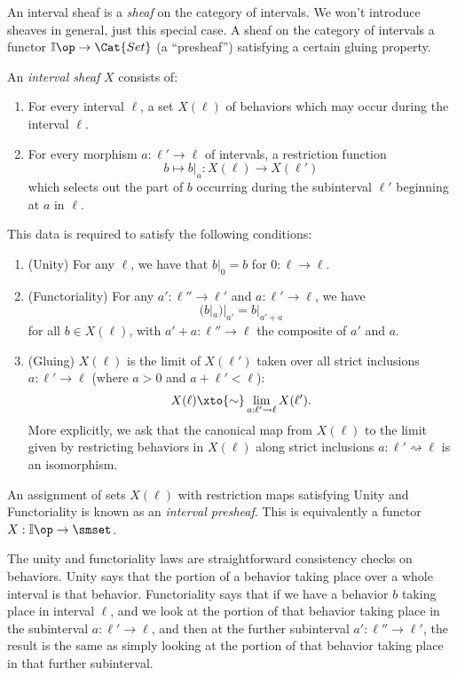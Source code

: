 \documentclass[DynamicalBook]{subfiles}
\begin{document}
 An interval sheaf is a \emph{sheaf} on the category of intervals. We won't introduce sheaves in general, just this special case. A sheaf on the category of intervals a functor $\mathbb{I}\op \to \Cat{Set}$ (a
 ``presheaf'') satisfying a certain gluing property.
 \begin{definition}
   An \emph{interval sheaf} $X$ consists of:
   \begin{enumerate}
           \item For every interval $\ell$, a set $X(\ell)$ of behaviors which may occur during the interval $\ell$.
     \item For every morphism $a : \ell' \to \ell$ of intervals, a restriction function
           $$b \mapsto b|_{a} : X(\ell) \to X(\ell')$$
           which selects out the part of $b$ occurring during the subinterval $\ell'$ beginning at $a$ in $\ell$.
    \end{enumerate}
    This data is required to satisfy the following conditions:
    \begin{enumerate}
            \item (Unity) For any $\ell$, we have that $b|_{0} = b$ for $0 : \ell \to \ell$.
      \item (Functoriality) For any $a' : \ell'' \to \ell'$ and $a : \ell' \to \ell$, we have
            $$(b|_{a})|_{a'} = b|_{a' + a}$$
            for all $b \in X(\ell)$, with $a' + a : \ell'' \to \ell$ the composite of $a'$ and $a$.
      \item (Gluing) $X(\ell)$ is the limit of $X(\ell')$ taken over all strict inclusions $a : \ell' \to \ell$ (where $a > 0$ and $a + \ell' < \ell$):
            \[
            X(\ell) \xto{\sim} \lim_{a : \ell' \rightsquigarrow \ell} X(\ell').
            \]
More explicitly, we ask that the canonical map from $X(\ell)$ to the limit given by restricting behaviors in $X(\ell)$ along strict inclusions $a : \ell' \rightsquigarrow \ell$ is an isomorphism.
    \end{enumerate}
    An assignment of sets $X(\ell)$ with restriction maps satisfying Unity and Functoriality is known as an \emph{interval presheaf}. This is equivalently a functor $X :  \mathbb{I}\op \to \smset$.
\end{definition}

The unity and functoriality laws are straightforward consistency checks on behaviors. Unity says that the portion of a behavior taking place over a whole interval is that behavior. Functoriality says that if we have a behavior $b$ taking place in interval $\ell$, and we look at the portion of that behavior taking place in the subinterval $a : \ell' \to \ell$, and then at the further subinterval $a' : \ell'' \to \ell'$, the result is the same as simply looking at the portion of that behavior taking place in that further subinterval.
\end{document}
